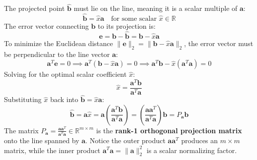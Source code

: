 The projected point $\hat{\mathbf{b}}$ must lie on the line, meaning it is a scalar multiple of $\mathbf{a}$:
\begin{equation}
\hat{\mathbf{b}} = \hat{x}\mathbf{a} \quad \text{for some scalar } \hat{x} \in \mathbb{R}
\end{equation}
The error vector connecting $\mathbf{b}$ to its projection is:
\begin{equation}
\mathbf{e} = \mathbf{b} - \hat{\mathbf{b}} = \mathbf{b} - \hat{x}\mathbf{a}
\end{equation}
To minimize the Euclidean distance $\|\mathbf{e}\|_2 = \|\mathbf{b} - \hat{x}\mathbf{a}\|_2$, the error vector must be perpendicular to the line vector $\mathbf{a}$:
\begin{equation}
\mathbf{a}^T \mathbf{e} = 0 \implies \mathbf{a}^T (\mathbf{b} - \hat{x}\mathbf{a}) = 0 \implies \mathbf{a}^T \mathbf{b} - \hat{x}(\mathbf{a}^T \mathbf{a}) = 0
\end{equation}
Solving for the optimal scalar coefficient $\hat{x}$:
\begin{equation}
\hat{x} = \frac{\mathbf{a}^T \mathbf{b}}{\mathbf{a}^T \mathbf{a}}
\label{eq:scalar_proj_coeff}
\end{equation}
Substituting $\hat{x}$ back into $\hat{\mathbf{b}} = \hat{x}\mathbf{a}$:
\begin{equation}
\hat{\mathbf{b}} = \mathbf{a} \hat{x} = \mathbf{a} \left( \frac{\mathbf{a}^T \mathbf{b}}{\mathbf{a}^T \mathbf{a}} \right) = \left( \frac{\mathbf{a}\mathbf{a}^T}{\mathbf{a}^T \mathbf{a}} \right) \mathbf{b} = P_{\mathbf{a}} \mathbf{b}
\end{equation}
The matrix $P_{\mathbf{a}} = \frac{\mathbf{a}\mathbf{a}^T}{\mathbf{a}^T \mathbf{a}} \in \mathbb{R}^{m \times m}$ is the \textbf{rank-1 orthogonal projection matrix} onto the line spanned by $\mathbf{a}$. Notice the outer product $\mathbf{a}\mathbf{a}^T$ produces an $m \times m$ matrix, while the inner product $\mathbf{a}^T \mathbf{a} = \|\mathbf{a}\|_2^2$ is a scalar normalizing factor.

